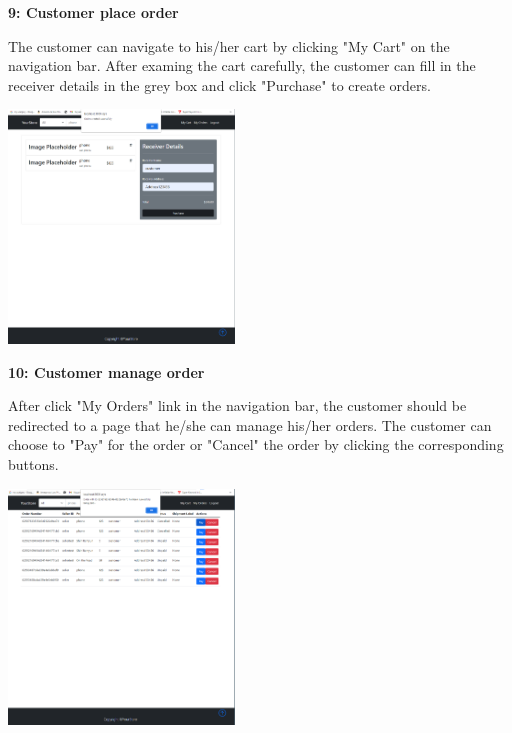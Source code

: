 \documentclass[12pt]{article}
\begin{document}
\vspace*{5mm}
\textbf{9: Customer place order}

The customer can navigate to his/her cart by clicking "My Cart" on the navigation bar. After examing 
the cart carefully, the customer can fill in the receiver details in the grey box and click "Purchase" to create orders.

\includegraphics[width=0.45\textwidth]{UserGuideImage/16.png}

\newpage
\textbf{10: Customer manage order}

After click "My Orders" link in the navigation bar, the customer should be redirected to a page that he/she can manage 
his/her orders. The customer can choose to "Pay" for the order or "Cancel" the order by clicking 
the corresponding buttons.

\includegraphics[width=0.45\textwidth]{UserGuideImage/17.png}
\end{document}
